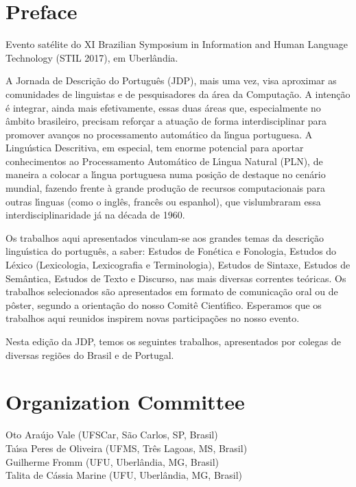 

\section*{Preface}

Evento sat\'elite do XI Brazilian Symposium in Information and Human
Language Technology (STIL 2017), em Uberl\^andia.

A Jornada de Descri\c{c}\~ao do Portugu\^es (JDP), mais uma vez, visa
aproximar as comunidades de linguistas e de pesquisadores da \'area da
Computa\c{c}\~ao. A inten\c{c}\~ao \'e integrar, ainda mais efetivamente, essas duas
\'areas que, especialmente no \^ambito brasileiro, precisam refor\c{c}ar a
atua\c{c}\~ao de forma interdisciplinar para promover avan\c{c}os no
processamento autom\'atico da l\'{\i}ngua portuguesa. A Lingu\'{\i}stica
Descritiva, em especial, tem enorme potencial para aportar
conhecimentos ao Processamento Autom\'atico de L\'{\i}ngua Natural (PLN), de
maneira a colocar a l\'{\i}ngua portuguesa numa posi\c{c}\~ao de destaque no
cen\'ario mundial, fazendo frente \`a grande produ\c{c}\~ao de recursos
computacionais para outras l\'{\i}nguas (como o ingl\^es, franc\^es ou
espanhol), que vislumbraram essa interdisciplinaridade j\'a na d\'ecada de
1960.

Os trabalhos aqui apresentados vinculam-se aos grandes temas da
descri\c{c}\~ao lingu\'{\i}stica do portugu\^es, a saber: Estudos de Fon\'etica e
Fonologia, Estudos do L\'exico (Lexicologia, Lexicografia e
Terminologia), Estudos de Sintaxe, Estudos de Sem\^antica, Estudos de
Texto e Discurso, nas mais diversas correntes te\'oricas. Os trabalhos
selecionados s\~ao apresentados em formato de comunica\c{c}\~ao oral ou de
p\^oster, segundo a orienta\c{c}\~ao do nosso Comit\^e Cient\'{\i}fico.  Esperamos
que os trabalhos aqui reunidos inspirem novas participa\c{c}\~oes no nosso
evento.

Nesta edi\c{c}\~ao da JDP, temos os seguintes trabalhos, apresentados por
colegas de diversas regi\~oes do Brasil e de Portugal.



\section*{Organization Committee}
Oto Ara\'ujo Vale (UFSCar, S\~ao Carlos, SP, Brasil)\\
Ta\'{\i}sa Peres de Oliveira (UFMS, Tr\^es Lagoas, MS, Brasil)\\
Guilherme Fromm (UFU, Uberl\^andia, MG, Brasil)\\
Talita de C\'assia Marine (UFU, Uberl\^andia, MG, Brasil)


